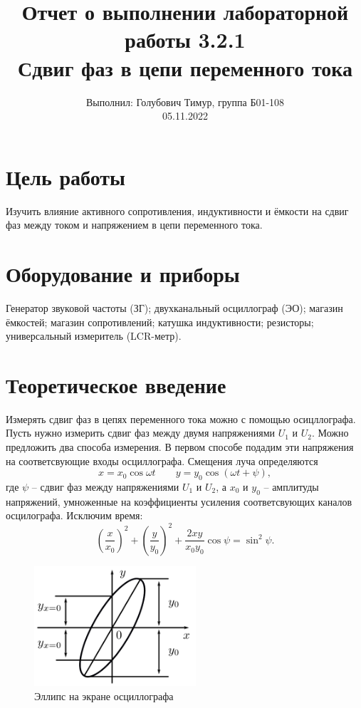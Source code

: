 \documentclass[12pt,a4paper]{article}
\author{\normalsize Выполнил: Голубович Тимур, группа Б01-108 \\
	\normalsize 05.11.2022}
\date{}
\title{
	\large Отчет о выполнении лабораторной работы 3.2.1 \\
	\Large Сдвиг фаз в цепи переменного тока \\ 
	
}
\begin{document}
	\maketitle
	
\section*{Цель работы}
Изучить влияние активного сопротивления, индуктивности и ёмкости на сдвиг фаз между током и напряжением в цепи переменного тока.


\section*{Оборудование и приборы} 
Генератор звуковой частоты (ЗГ); 
двухканальный осциллограф (ЭО); 
магазин ёмкостей; 
магазин сопротивлений; 
катушка индуктивности; 
резисторы; 
универсальный измеритель (LCR-метр).

	
\section*{Теоретическое введение}

		Измерять сдвиг фаз в цепях переменного тока можно с помощью осицллографа. Пусть нужно измерить сдвиг фаз между двумя напряжениями $U_1$ и $U_2$. Можно предложить два способа измерения. В первом способе подадим эти напряжения на соответсвующие входы осциллографа. Смещения луча определяются 
		$$ x = x_0\cos\omega t \qquad y = y_0\cos\left(\omega t +\psi\right), $$
		где $\psi$ -- сдвиг фаз между напряжениями $U_1$ и $U_2$, а $x_0$ и $y_0$ -- амплитуды напряжений, умноженные на коэффициенты усиления соответсвующих каналов осцилографа.
		Исключим время:
		$$ \left(\frac{x}{x_0}\right)^2 + \left(\frac{y}{y_0}\right)^2+\frac{2xy}{x_0y_0}\cos\psi = \sin^2\psi.$$
		
        \begin{figure}[h!]
        	\centering
        	\includegraphics[width=6cm]{res/el.png}
        	\caption{Эллипс на экране осциллографа}
        	\label{fig:f}
        \end{figure}	
	
\end{document}
